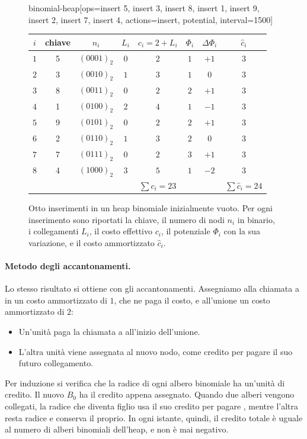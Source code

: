 \begin{figure}[htbp]
\centering
\begin{widget}{binomial-heap}[ops={insert 5, insert 3, insert 8, insert 1, insert 9, insert 2, insert 7, insert 4}, actions={insert}, potential, interval=1500]
\small
\begin{tabular}{cccccccc}
\toprule
$i$ & chiave & $n_i$ & $L_i$ & $c_i = 2 + L_i$ & $\Phi_i$ & $\Delta\Phi_i$ & $\hat c_i$ \\
\midrule
$1$ & 5 & $(0001)_2$ & $0$ & $2$ & $1$ & $+1$ & $3$ \\
$2$ & 3 & $(0010)_2$ & $1$ & $3$ & $1$ & $0$ & $3$ \\
$3$ & 8 & $(0011)_2$ & $0$ & $2$ & $2$ & $+1$ & $3$ \\
$4$ & 1 & $(0100)_2$ & $2$ & $4$ & $1$ & $-1$ & $3$ \\
$5$ & 9 & $(0101)_2$ & $0$ & $2$ & $2$ & $+1$ & $3$ \\
$6$ & 2 & $(0110)_2$ & $1$ & $3$ & $2$ & $0$ & $3$ \\
$7$ & 7 & $(0111)_2$ & $0$ & $2$ & $3$ & $+1$ & $3$ \\
$8$ & 4 & $(1000)_2$ & $3$ & $5$ & $1$ & $-2$ & $3$ \\
\midrule
 & & & & $\sum c_i = 23$ & & & $\sum \hat c_i = 24$ \\
\bottomrule
\end{tabular}
\end{widget}
\caption{Otto inserimenti in un heap binomiale inizialmente vuoto. Per ogni inserimento sono riportati la chiave, il numero di nodi $n_i$ in binario, i collegamenti $L_i$, il costo effettivo $c_i$, il potenziale $\Phi_i$ con la sua variazione, e il costo ammortizzato $\hat c_i$.}
\label{fig:hb-inserimenti}
\end{figure}

\paragraph{Metodo degli accantonamenti.}
Lo stesso risultato si ottiene con gli accantonamenti. Assegniamo alla chiamata a \MakeBinomialHeap{} in \BinomialHeapInsert{} un costo ammortizzato di $1$, che ne paga il costo, e all'unione un costo ammortizzato di $2$:
\begin{itemize}
    \item Un'unità paga la chiamata a \MakeBinomialHeap{} all'inizio dell'unione.
    \item L'altra unità viene assegnata al nuovo nodo, come credito per pagare il suo futuro collegamento.
\end{itemize}
Per induzione si verifica che la radice di ogni albero binomiale ha un'unità di credito. Il nuovo $B_0$ ha il credito appena assegnato. Quando due alberi vengono collegati, la radice che diventa figlio usa il suo credito per pagare \BinomialLink{}, mentre l'altra resta radice e conserva il proprio. In ogni istante, quindi, il credito totale è uguale al numero di alberi binomiali dell'heap, e non è mai negativo.

